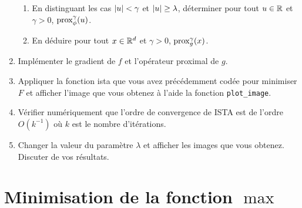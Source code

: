 \documentclass[a4paper,french,12pt]{article}
\begin{document}
\begin{enumerate}
\begin{enumerate}
  \item En distinguant les cas $\left\vert u \right\vert < \gamma$ et $\left\vert u \right\vert \geq \lambda$, déterminer pour tout $u \in \mathbb{R}$ et $\gamma >0$, $\operatorname{prox}_{\phi}^{\gamma}(u)$.
    
  \item En déduire pour tout $x \in \mathbb{R}^d$ et $\gamma >0$, $\operatorname{prox}_{g}^{\gamma}(x)$. 
  \end{enumerate}
  
\item Implémenter le gradient de $f$ et l'opérateur proximal de $g$.
  
\item Appliquer la fonction ista que vous avez précédemment codée pour minimiser $F$ et afficher l'image que vous obtenez à l'aide la fonction \lstinline+plot_image+.
  
\item Vérifier numériquement que l'ordre de convergence de ISTA est de l'ordre $O(k^{-1})$ où $k$ est le nombre d'itérations.
  
\item Changer la valeur du paramètre $\lambda$ et afficher les images que vous obtenez. Discuter de vos résultats. 
\end{enumerate}

\section{Minimisation de la fonction $\max$}
\label{sec:minimisation-de-la}
\end{document}
